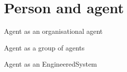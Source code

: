 \chapter{Person and agent}


Agent as an organisational agent

Agent as a group of agents 

Agent as an EngineeredSystem